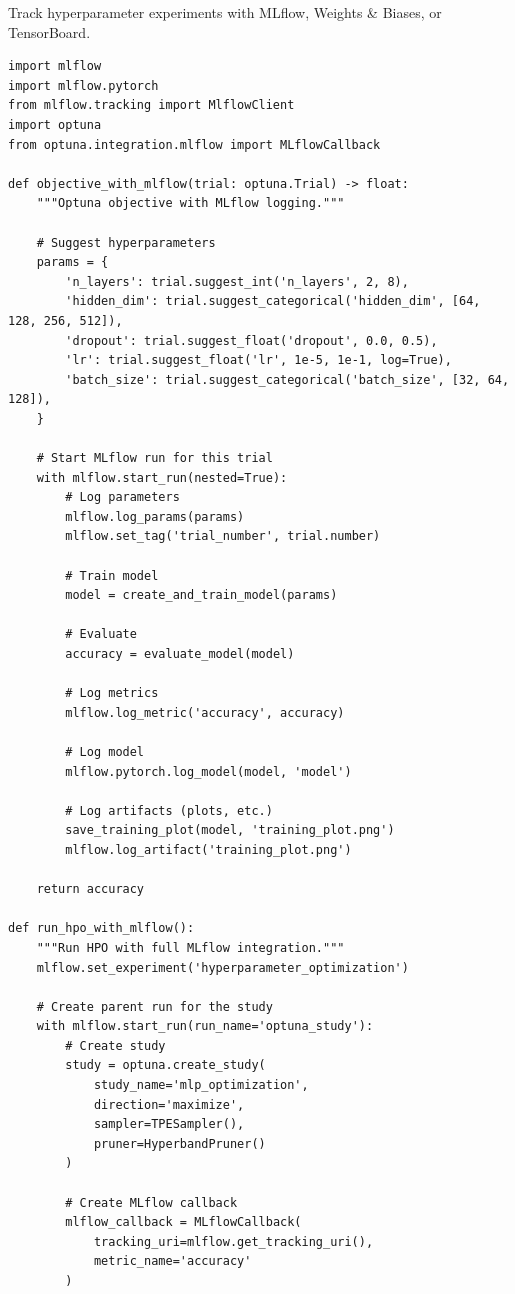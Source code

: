 Track hyperparameter experiments with MLflow, Weights \& Biases, or TensorBoard.

\begin{lstlisting}[style=python, caption=HPO with MLflow tracking]
import mlflow
import mlflow.pytorch
from mlflow.tracking import MlflowClient
import optuna
from optuna.integration.mlflow import MLflowCallback

def objective_with_mlflow(trial: optuna.Trial) -> float:
    """Optuna objective with MLflow logging."""

    # Suggest hyperparameters
    params = {
        'n_layers': trial.suggest_int('n_layers', 2, 8),
        'hidden_dim': trial.suggest_categorical('hidden_dim', [64, 128, 256, 512]),
        'dropout': trial.suggest_float('dropout', 0.0, 0.5),
        'lr': trial.suggest_float('lr', 1e-5, 1e-1, log=True),
        'batch_size': trial.suggest_categorical('batch_size', [32, 64, 128]),
    }

    # Start MLflow run for this trial
    with mlflow.start_run(nested=True):
        # Log parameters
        mlflow.log_params(params)
        mlflow.set_tag('trial_number', trial.number)

        # Train model
        model = create_and_train_model(params)

        # Evaluate
        accuracy = evaluate_model(model)

        # Log metrics
        mlflow.log_metric('accuracy', accuracy)

        # Log model
        mlflow.pytorch.log_model(model, 'model')

        # Log artifacts (plots, etc.)
        save_training_plot(model, 'training_plot.png')
        mlflow.log_artifact('training_plot.png')

    return accuracy

def run_hpo_with_mlflow():
    """Run HPO with full MLflow integration."""
    mlflow.set_experiment('hyperparameter_optimization')

    # Create parent run for the study
    with mlflow.start_run(run_name='optuna_study'):
        # Create study
        study = optuna.create_study(
            study_name='mlp_optimization',
            direction='maximize',
            sampler=TPESampler(),
            pruner=HyperbandPruner()
        )

        # Create MLflow callback
        mlflow_callback = MLflowCallback(
            tracking_uri=mlflow.get_tracking_uri(),
            metric_name='accuracy'
        )


\end{lstlisting}
